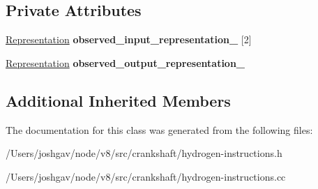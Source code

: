 \subsection*{Private Attributes}
\begin{DoxyCompactItemize}
\item 
\hyperlink{classv8_1_1internal_1_1_representation}{Representation} {\bfseries observed\+\_\+input\+\_\+representation\+\_\+} \mbox{[}2\mbox{]}\hypertarget{classv8_1_1internal_1_1_h_binary_operation_afcce9dd599e29f8fb446380d94e8fd6c}{}\label{classv8_1_1internal_1_1_h_binary_operation_afcce9dd599e29f8fb446380d94e8fd6c}

\item 
\hyperlink{classv8_1_1internal_1_1_representation}{Representation} {\bfseries observed\+\_\+output\+\_\+representation\+\_\+}\hypertarget{classv8_1_1internal_1_1_h_binary_operation_af74bc9eb188010067dbe6fbb653e8bef}{}\label{classv8_1_1internal_1_1_h_binary_operation_af74bc9eb188010067dbe6fbb653e8bef}

\end{DoxyCompactItemize}
\subsection*{Additional Inherited Members}


The documentation for this class was generated from the following files\+:\begin{DoxyCompactItemize}
\item 
/\+Users/joshgav/node/v8/src/crankshaft/hydrogen-\/instructions.\+h\item 
/\+Users/joshgav/node/v8/src/crankshaft/hydrogen-\/instructions.\+cc\end{DoxyCompactItemize}
